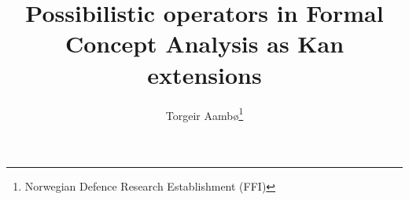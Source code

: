 \documentclass[11pt, twocolumn]{article}
\author{Torgeir Aamb\o \thanks{Norwegian Defence Research Establishment (FFI)}}
\title{Possibilistic operators in Formal Concept Analysis as Kan extensions}
\date{}
\begin{document}
\maketitle 
 







\printbibliography{}  
\end{document}
